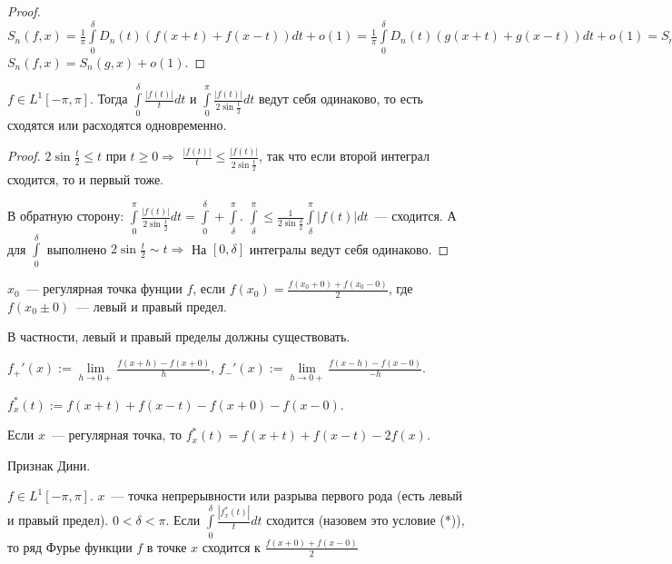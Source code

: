 \begin{proof}
    $S_n(f, x) = \frac{1}{\pi} \int \limits_{0}^{\delta} D_n(t) (f(x + t) + f(x - t)) dt + o(1) =
        \frac{1}{\pi} \int \limits_{0}^{\delta} D_n(t) (g(x + t) + g(x - t)) dt + o(1) = S_n(g, x) \Rightarrow$
    $S_n(f, x) = S_n(g, x) + o(1)$.
\end{proof}

\begin{lemma}
    $f \in L^1 [-\pi, \pi]$. Тогда $\int \limits_{0}^{\delta} \frac{|f(t)|}{t} dt$ и
    $\int \limits_{0}^{\pi} \frac{|f(t)|}{2 \sin \frac{t}{2}} dt$ ведут себя одинаково, то есть сходятся или расходятся одновременно.
\end{lemma}

\begin{proof}
    $2 \sin \frac{t}{2} \le t$ при $t \ge 0 \Rightarrow$
    $\frac{|f(t)|}{t} \le \frac{|f(t)|}{2 \sin \frac{t}{2}}$, так что если второй интеграл сходится, то и первый тоже.

    В обратную сторону:
    $\int \limits_{0}^{\pi} \frac{|f(t)|}{2 \sin \frac{t}{2}} dt = \int \limits_{0}^{\delta} + \int \limits_{\delta}^{\pi}$.
    $\int \limits_{\delta}^{\pi} \le \frac{1}{2 \sin \frac{\delta}{2}} \int \limits_{\delta}^{\pi} |f(t)| dt$~--- сходится.
    А для $\int \limits_{0}^{\delta}$ выполнено $2 \sin \frac{t}{2} \sim t \Rightarrow$
    На $[0, \delta]$ интегралы ведут себя одинаково.
\end{proof}

\begin{definition}
    $x_0$~--- регулярная точка фунции $f$, если $f(x_0) = \frac{f(x_0 + 0) + f(x_0 - 0)}{2}$, где
    $f(x_0 \pm 0)$~--- левый и правый предел.

    В частности, левый и правый пределы должны существовать.

    $f_+'(x) := \lim \limits_{h \to 0+} \frac{f(x + h) - f(x + 0)}{h}$,
    $f_-'(x) := \lim \limits_{h \to 0+} \frac{f(x - h) - f(x - 0)}{-h}$.
\end{definition}

\begin{designation}
    $f_x^*(t) := f(x + t) + f(x - t) - f(x + 0) - f(x - 0)$.

    Если $x$~--- регулярная точка, то $f_x^*(t) = f(x + t) + f(x - t) - 2f(x)$.
\end{designation}

\begin{theorem} Признак Дини.

    $f \in L^1[-\pi, \pi]$. $x$~--- точка непрерывности или разрыва первого рода (есть левый и правый предел).
    $0 < \delta < \pi$. Если $\int \limits_{0}^{\delta} \frac{|f_x^*(t)|}{t} dt$ сходится (назовем это условие (*)), то ряд Фурье функции $f$ в точке $x$ сходится
    к $\frac{f(x + 0) + f(x - 0)}{2}$
\end{theorem}

